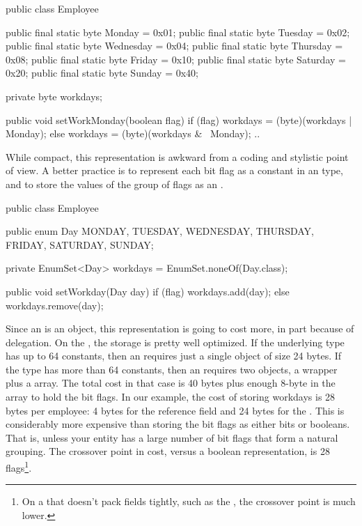 \begin{shortlisting}
	public class Employee {
	
		public final static byte Monday = 0x01;
		public final static byte Tuesday = 0x02;
		public final static byte Wednesday = 0x04;
		public final static byte Thursday = 0x08;
		public final static byte Friday = 0x10;
		public final static byte Saturday = 0x20;
		public final static byte Sunday = 0x40;
		
		private byte workdays;
		
		public void setWorkMonday(boolean flag) {
			if (flag) {
				workdays = (byte)(workdays | Monday);
			} else {
				workdays = (byte)(workdays & ~Monday);
			}
		}
		..
   }
		       
\end{shortlisting}

While compact, this representation is awkward from a coding and
stylistic point of view. A better practice is to represent each bit flag
as a constant in an  type, and to store the values of the group
of flags as an .

\begin{shortlisting}

    public class Employee {
 
		public enum Day {MONDAY, TUESDAY, WEDNESDAY, THURSDAY, FRIDAY, SATURDAY, SUNDAY};
    	
    	private EnumSet<Day> workdays = EnumSet.noneOf(Day.class);
    
   	 	public void setWorkday(Day day) {
			if (flag) {
				workdays.add(day);
			} else {
				workdays.remove(day);
			}
		}
	}
    
    
\end{shortlisting}

Since an  is an object, this representation is going to
cost more, in part because of delegation. On the \oracle \jre, the
storage is pretty well optimized. If the underlying  type has up to 64 constants,
then an  requires just a single object of size 24 bytes. If
the  type has more than 64 constants, then an  requires
two objects, a wrapper plus a  array. The total cost in that case
is 40 bytes plus enough 8-byte  in the array to hold the bit flags. 
In our example, the cost of storing workdays is 28 bytes per employee:
4 bytes for the reference field and 24 bytes for the . 
This is considerably more expensive than storing the bit flags as either bits or
booleans. That is, unless your entity has a large number of bit flags
that form a natural grouping. The crossover point in cost, versus a boolean
representation, is 28 flags\footnote{On a \jre that doesn't pack 
fields tightly, such as the \ibm \jre, the crossover point is much lower.}.

